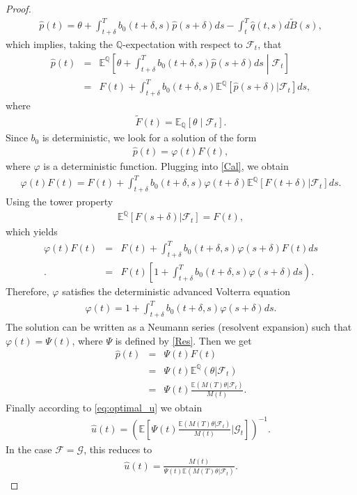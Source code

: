 \documentclass[12pt]{article}
\theoremstyle{remark}
\numberwithin{equation}{section}
\def\E{\mathbb E}
\def\Q{\mathbb Q}
\def\E{\mathbb E}
\begin{document}
\begin{proof}
\begin{eqnarray*}
\hat{p}(t) = \theta + \int_{t+\delta}^T b_0(t+\delta,s)\hat{p}(s+\delta)ds -\int_t^T \hat{q}(t,s)d\widetilde{B}(s),
\end{eqnarray*}
which implies, taking the $\Q$-expectation with respect to $\mathcal{F}_t$, that
\begin{eqnarray}\label{Cal}
\hat{p}(t)&=&\E^{\Q}\left[\theta + \int_{t+\delta}^T b_0(t+\delta,s)\hat{p}(s+\delta)ds\middle|\mathcal{F}_t\right]\nonumber\\
&=& F(t)+\int_{t+\delta}^T b_0(t+\delta,s)\E^{\Q}\left[\hat{p}(s+\delta)|\mathcal{F}_t\right]ds,
\end{eqnarray}
where
\begin{eqnarray*}
\tilde{F}(t)=\mathbb{E}_{\mathbb{Q}}[\theta \mid \mathcal{F}_t].
\end{eqnarray*}
Since $b_0$ is deterministic, we look for a solution of the form 
\begin{eqnarray*}
\hat{p}(t)=\varphi(t)F(t),
\end{eqnarray*}
where $\varphi$ is a deterministic function.
Plugging into \eqref{Cal}, we obtain
\begin{eqnarray*}
\varphi(t)F(t)=F(t)+\int_{t+\delta}^T b_0(t+\delta,s)\varphi(t+\delta)\E^{\Q}\left[F(t+\delta)|\mathcal{F}_t\right]ds.
\end{eqnarray*}
Using the tower property
\begin{eqnarray*}
	\E^{\Q}\left[F(s+\delta)|\mathcal{F}_t\right]=F(t), 
\end{eqnarray*}
which yields
\begin{eqnarray*}
\varphi(t)F(t)&=&F(t)+\int_{t+\delta}^T b_0(t+\delta,s)\varphi(s+\delta)F(t)ds\\
.&=& F(t)\left [1+\int_{t+\delta}^T b_0(t+\delta,s)\varphi(s+\delta)ds\right).
\end{eqnarray*}
Therefore, $\varphi$ satisfies the deterministic advanced Volterra equation
\begin{eqnarray*}
	\varphi(t)=1+\int_{t+\delta}^T b_0(t+\delta,s)\varphi(s+\delta)ds.
\end{eqnarray*}
The solution can be written as a Neumann series (resolvent expansion) such that
$\varphi(t)=\Psi(t)$, where $\Psi$ is defined by \eqref{Res}.
Then we get
\begin{eqnarray*}
\hat{p}(t)&=&	\Psi(t)F(t)\\
&=&\Psi(t)\E^{\Q}(\theta|\mathcal{F}_t)\\
&=&\Psi(t)\frac{\E(M(T)\theta|\mathcal{F}_t)}{M(t)}.
\end{eqnarray*}
Finally according to \eqref{eq:optimal_u} we obtain
\begin{eqnarray*}
\hat{u}(t)=\left(\E\left[\Psi(t)\frac{\E(M(T)\theta|\mathcal{F}_t)}{M(t)}|\mathcal{G}_t\right]\right)^{-1}	.
\end{eqnarray*}
In the case $\mathcal{F}=\mathcal{G}$, this reduces to
\begin{eqnarray*}
\hat{u}(t)=\frac{M(t)}{\Psi(t)\E(M(T)\theta|\mathcal{F}_t)}.
\end{eqnarray*}
\end{proof}
\end{document}
